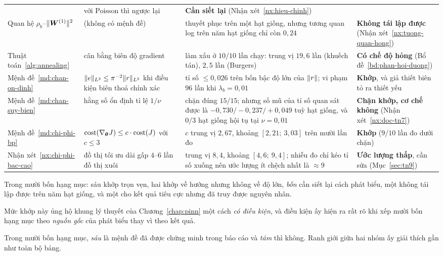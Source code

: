 \begin{longtable}{@{}p{2.9cm}p{3.7cm}p{3.9cm}p{3.0cm}@{}}
& với Poisson thì ngược lại
& \textbf{Cần siết lại} (Nhận xét~\ref{nx:hieu-chinh}) \\[4pt]
Quan hệ $\rho_b$--$\lVert\bm{W}^{(1)}\rVert^2$
& (không có mệnh đề)
& thuyết phục trên một hạt giống, nhưng tương quan log trên năm hạt giống chỉ
  còn $0{,}24$
& \textbf{Không tái lập được} (Nhận xét~\ref{nx:tuong-quan-hong}) \\[4pt]
Thuật toán~\ref{alg:annealing}
& cân bằng biên độ gradient
& làm xấu ở $10/10$ lần chạy: trung vị $19{,}6$ lần (khuếch tán), $2{,}5$ lần
  (Burgers)
& \textbf{Có chế độ hỏng} (Bổ đề~\ref{bd:phan-hoi-duong}) \\[4pt]
Mệnh đề~\ref{md:chan-on-dinh}
& $\lVert e\rVert_{L^2}\le \pi^{-2}\lVert r\rVert_{L^2}$ khi điều kiện biên thoả chính xác
& tỉ số $\le 0{,}026$ trên bốn bậc độ lớn của $\lVert r\rVert$; vi phạm $96$ lần khi
  $\lambda_b = 0{,}01$
& \textbf{Khớp}, và giả thiết biên tỏ ra thiết yếu \\[4pt]
Mệnh đề~\ref{md:chan-suy-bien}
& hằng số ổn định tỉ lệ $1/\nu$
& chặn đúng $15/15$; nhưng số mũ của tỉ số quan sát được là
  $-0{,}730 / -0{,}237 / +0{,}049$ tuỳ hạt giống, và $0/3$ hạt giống hội tụ tại
  $\nu = 0{,}01$
& \textbf{Chặn khớp, cơ chế không} (Nhận xét~\ref{nx:doc-tn7}) \\[4pt]
Mệnh đề~\ref{md:chi-phi-bp}
& $\mathrm{cost}(\nabla_{\bm{\theta}}J) \le c\cdot\mathrm{cost}(J)$ với $c\le 3$
& $c$ trung vị $2{,}67$, khoảng $[2{,}21;\ 3{,}03]$ trên mười lần đo
& \textbf{Khớp} ($9/10$ lần đo dưới chặn) \\[4pt]
Nhận xét~\ref{nx:chi-phi-bac-cao}
& đồ thị tối ưu dài gấp $4$--$6$ lần đồ thị xuôi
& trung vị $8{,}4$, khoảng $[4{,}6;\ 9{,}4]$; nhiễu đo chỉ kéo tỉ số xuống nên
  ước lượng ít chệch nhất là $\approx 9$
& \textbf{Ước lượng thấp}, cần sửa (Mục~\ref{sec:tn9})
\end{longtable}
\endgroup
 
Trong mười bốn hạng mục: sáu khớp trọn vẹn, hai khớp về hướng nhưng không về độ
lớn, \emph{bốn} cần siết lại cách phát biểu, một không tái lập được trên năm hạt
giống, và một cho kết quả tiêu cực nhưng đã truy được nguyên nhân.

Mức khớp này ủng hộ khung lý thuyết của Chương~\ref{chap:pinn} một cách
\emph{có điều kiện}, và điều kiện ấy hiện ra rất rõ khi xếp mười bốn hạng mục
theo \emph{nguồn gốc} của phát biểu thay vì theo kết quả.

Trong mười bốn hạng mục, \emph{sáu} là mệnh đề đã được chứng minh trong báo cáo
và \emph{tám} thì không. Ranh giới giữa hai nhóm ấy giải thích gần như toàn bộ
bảng.

